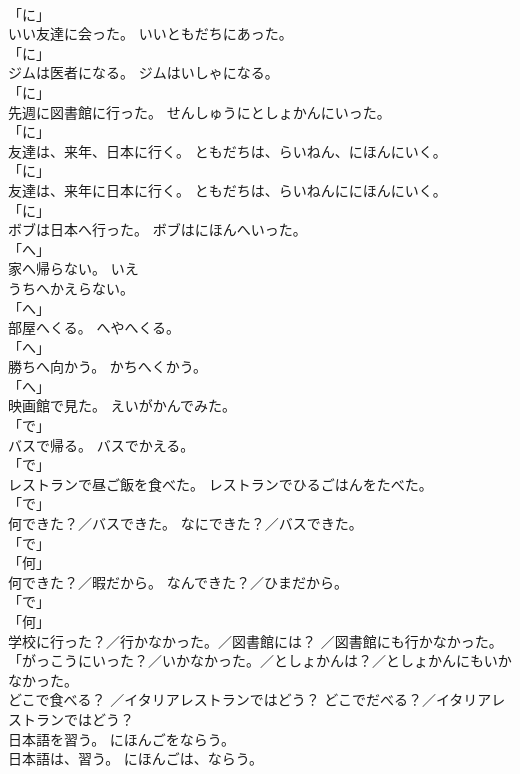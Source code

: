 \documentclass[8pt]{extreport}
\begin{document}
\begin{CJK}{UTF8}{min}
\\	「に」 
\\	いい友達に会った。	いいともだちにあった。	
\\	「に」 
\\	ジムは医者になる。	ジムはいしゃになる。	
\\	「に」 
\\	先週に図書館に行った。	せんしゅうにとしょかんにいった。	
\\	「に」 
\\	友達は、来年、日本に行く。	ともだちは、らいねん、にほんにいく。	
\\	「に」 
\\	友達は、来年に日本に行く。	ともだちは、らいねんににほんにいく。	
\\	「に」 
\\	ボブは日本へ行った。	ボブはにほんへいった。	
\\	「へ」 
\\	家へ帰らない。	{いえ
\\	うち}へかえらない。	
\\	「へ」 
\\	部屋へくる。	へやへくる。	
\\	「へ」 
\\	勝ちへ向かう。	かちへくかう。	
\\	「へ」 
\\	映画館で見た。	えいがかんでみた。	
\\	「で」 
\\	バスで帰る。	バスでかえる。	
\\	「で」 
\\	レストランで昼ご飯を食べた。	レストランでひるごはんをたべた。	
\\	「で」 
\\	何できた？／バスできた。	なにできた？／バスできた。	
\\	「で」 
\\	「何」	
\\	何できた？／暇だから。	なんできた？／ひまだから。	
\\	「で」 
\\	「何」	
\\	学校に行った？／行かなかった。／図書館には？ ／図書館にも行かなかった。	「がっこうにいった？／いかなかった。／としょかんは？／としょかんにもいかなかった。	
\\	どこで食べる？ ／イタリアレストランではどう？	どこでだべる？／イタリアレストランではどう？	
\\	日本語を習う。	にほんごをならう。	
\\	日本語は、習う。	にほんごは、ならう。	

\end{CJK}
\end{document}
